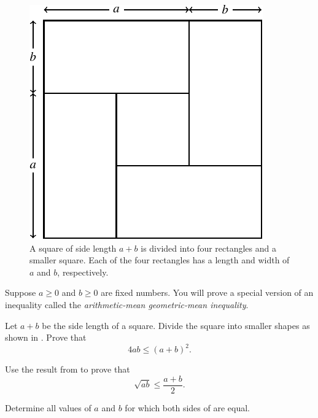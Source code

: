 \documentclass[a4paper,oneside,12pt]{article}
\begin{document}
\begin{problem}
\begin{figure}[!htbp]
\centering
\includegraphics[scale=1]{image/07/arithmetic-geometric-inequality.pdf}
\caption{%
  A square of side length $a + b$ is divided into four rectangles and
  a smaller square.  Each of the four rectangles has a length and
  width of $a$ and $b$, respectively.
}
\label{fig:arithmetic_mean_geometric_mean_inequality}
\end{figure}

\item Suppose $a \geq 0$ and $b \geq 0$ are fixed numbers.  You will
  prove a special version of an inequality called the
  \emph{arithmetic-mean geometric-mean inequality}.
  \begin{packedenum}
  \item\label{subprob:AMGM_geometry}
    Let $a + b$ be the side length of a square.  Divide the square
    into smaller shapes as shown in
    .  Prove
    that
    \begin{equation}
    \label{eqn:AMGM_geometry}
    4ab
    \leq
    (a + b)^2.
    \end{equation}

  \item\label{subprob:AMGM_inequality}
    Use the result from  to prove that
    \begin{equation}
    \label{eqn:AMGM_inequality}
    \sqrt{ab}
    \leq
    \frac{a + b}{2}.
    \end{equation}

  \item\label{subprob:AMGM_equality}
    Determine all values of $a$ and $b$ for which both sides of
     are equal.
  \end{packedenum}
\end{problem}
\end{document}
